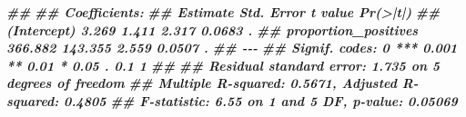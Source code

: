 \documentclass[
  11pt,
  oneside]{book}
\newenvironment{Shaded}{\begin{snugshade}}{\end{snugshade}}
\newcommand{\DocumentationTok}[1]{\textcolor[rgb]{0.56,0.35,0.01}{\textbf{\textit{#1}}}}
\begin{document}
\begin{Shaded}
\begin{Highlighting}[]
\DocumentationTok{\#\# }
\DocumentationTok{\#\# Coefficients:}
\DocumentationTok{\#\#                      Estimate Std. Error t value Pr(\textgreater{}|t|)  }
\DocumentationTok{\#\# (Intercept)             3.269      1.411   2.317   0.0683 .}
\DocumentationTok{\#\# proportion\_positives  366.882    143.355   2.559   0.0507 .}
\DocumentationTok{\#\# {-}{-}{-}}
\DocumentationTok{\#\# Signif. codes:  0 \textquotesingle{}***\textquotesingle{} 0.001 \textquotesingle{}**\textquotesingle{} 0.01 \textquotesingle{}*\textquotesingle{} 0.05 \textquotesingle{}.\textquotesingle{} 0.1 \textquotesingle{} \textquotesingle{} 1}
\DocumentationTok{\#\# }
\DocumentationTok{\#\# Residual standard error: 1.735 on 5 degrees of freedom}
\DocumentationTok{\#\# Multiple R{-}squared:  0.5671, Adjusted R{-}squared:  0.4805 }
\DocumentationTok{\#\# F{-}statistic:  6.55 on 1 and 5 DF,  p{-}value: 0.05069}


\end{Highlighting}
\end{Shaded}
\end{document}
